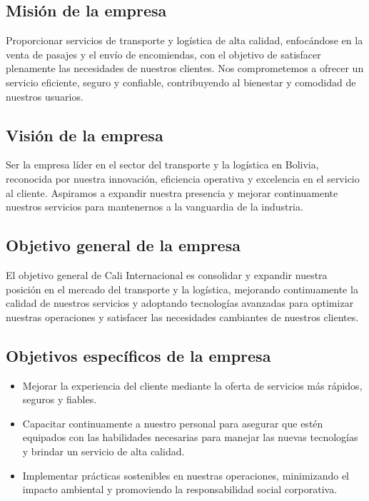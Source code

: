 \documentclass[12pt,letterpaper]{article}
\begin{document}
\subsection*{Misión de la empresa}

Proporcionar servicios de transporte y logística de alta calidad, enfocándose en la venta de pasajes y el envío de encomiendas, con el objetivo de satisfacer plenamente las necesidades de nuestros clientes. Nos comprometemos a ofrecer un servicio eficiente, seguro y confiable, contribuyendo al bienestar y comodidad de nuestros usuarios.

\subsection*{Visión de la empresa}

Ser la empresa líder en el sector del transporte y la logística en Bolivia, reconocida por nuestra innovación, eficiencia operativa y excelencia en el servicio al cliente. Aspiramos a expandir nuestra presencia y mejorar continuamente nuestros servicios para mantenernos a la vanguardia de la industria.

\subsection*{Objetivo general de la empresa}
El objetivo general de Cali Internacional es consolidar y expandir nuestra posición en el mercado del transporte y la logística, mejorando continuamente la calidad de nuestros servicios y adoptando tecnologías avanzadas para optimizar nuestras operaciones y satisfacer las necesidades cambiantes de nuestros clientes.

\subsection*{Objetivos específicos de la empresa}

\begin{itemize}[label=$\bullet$, left=0cm, labelsep = 1.05cm, topsep = 0pt, parsep = 0pt]
	
	\item Mejorar la experiencia del cliente mediante la oferta de servicios más rápidos, seguros y fiables.
	
	\item Capacitar continuamente a nuestro personal para asegurar que estén equipados con las habilidades necesarias para manejar las nuevas tecnologías y brindar un servicio de alta calidad.
	
	\item Implementar prácticas sostenibles en nuestras operaciones, minimizando el impacto ambiental y promoviendo la responsabilidad social corporativa.
	
\end{itemize}
\end{document}
